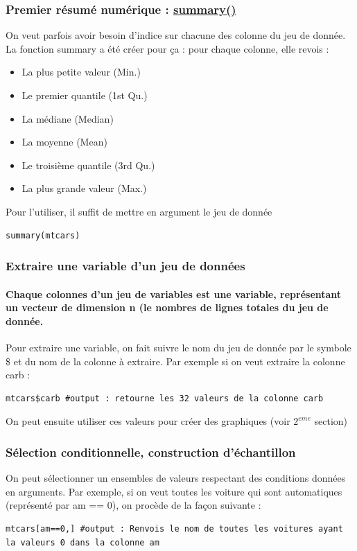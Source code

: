\documentclass{article}
\begin{document}
\subsubsection{Premier résumé numérique : \href{https://www.rdocumentation.org/packages/base/versions/3.6.2/topics/summary}{summary()} }
On veut parfois avoir besoin d'indice sur chacune des colonne du jeu de donnée. La fonction summary a été créer pour ça : pour chaque colonne, elle revois : 
\begin{itemize}
    \item La plus petite valeur (Min.)
    \item Le premier quantile (1st Qu.)
    \item La médiane (Median)
    \item La moyenne (Mean)
    \item Le troisième quantile (3rd Qu.)
    \item La plus grande valeur (Max.)
\end{itemize}
Pour l'utiliser, il suffit de mettre en argument le jeu de donnée 
\begin{verbatim}
summary(mtcars)
\end{verbatim}

\subsubsection{Extraire une variable d'un jeu de données}

\paragraph{Chaque colonnes d'un jeu de variables est une variable, représentant un vecteur de dimension n (le nombres de lignes totales du jeu de donnée.}Pour extraire une variable, on fait suivre le nom du jeu de donnée par le symbole \$ et du nom de la colonne à extraire. Par exemple si on veut extraire la colonne carb : 
\begin{verbatim}
mtcars$carb #output : retourne les 32 valeurs de la colonne carb
\end{verbatim}

On peut ensuite utiliser ces valeurs pour créer des graphiques (voir $2^{eme}$ section)
\newpage

\subsubsection{Sélection conditionnelle, construction d'échantillon}
On peut sélectionner un ensembles de valeurs respectant des conditions données en arguments. \newline Par exemple, si on veut toutes les voiture qui sont automatiques (représenté par am == 0), on procède de la façon suivante : 
\begin{verbatim}
mtcars[am==0,] #output : Renvois le nom de toutes les voitures ayant la valeurs 0 dans la colonne am
\end{verbatim}
\end{document}
